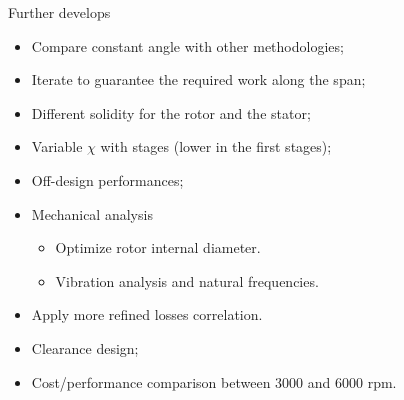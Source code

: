 \documentclass{beamer}
\begin{document}
\begin{frame}
\begin{table}[]
\centering
\caption{Stage properties}
\vspace{-0.3cm}
\end{table}
\end{frame}




\begin{frame}[t]{Further develops}
\begin{itemize}
\item Compare constant angle with other methodologies;
\item Iterate to guarantee the required work along the span;
\item Different solidity for the rotor and the stator;
\item Variable $\chi$ with stages (lower in the first stages);
\item Off-design performances;
\item Mechanical analysis
	\begin{itemize}
		\item Optimize rotor internal diameter.
		\item Vibration analysis and natural frequencies.
	\end{itemize}
\item Apply more refined losses correlation.
\item Clearance design;
\item Cost/performance comparison between 3000 and 6000 rpm.
\end{itemize}
\end{frame}
\end{document}
